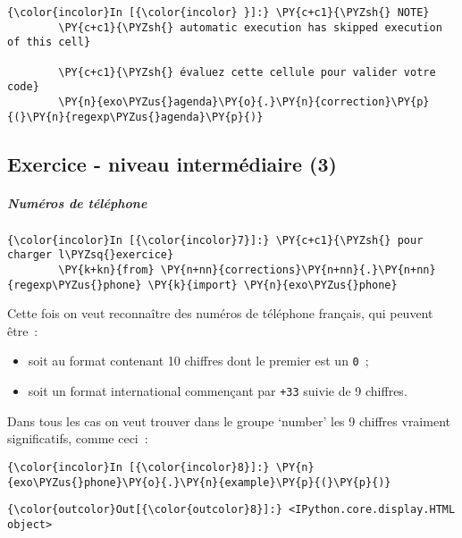    \begin{Verbatim}[commandchars=\\\{\}]
{\color{incolor}In [{\color{incolor} }]:} \PY{c+c1}{\PYZsh{} NOTE}
        \PY{c+c1}{\PYZsh{} automatic execution has skipped execution of this cell}
        
        \PY{c+c1}{\PYZsh{} évaluez cette cellule pour valider votre code}
        \PY{n}{exo\PYZus{}agenda}\PY{o}{.}\PY{n}{correction}\PY{p}{(}\PY{n}{regexp\PYZus{}agenda}\PY{p}{)}
\end{Verbatim}


    \hypertarget{exercice---niveau-intermuxe9diaire-3}{%
\subsection{Exercice - niveau intermédiaire
(3)}\label{exercice---niveau-intermuxe9diaire-3}}

    \hypertarget{numuxe9ros-de-tuxe9luxe9phone}{%
\subparagraph{Numéros de
téléphone}\label{numuxe9ros-de-tuxe9luxe9phone}}

    \begin{Verbatim}[commandchars=\\\{\}]
{\color{incolor}In [{\color{incolor}7}]:} \PY{c+c1}{\PYZsh{} pour charger l\PYZsq{}exercice}
        \PY{k+kn}{from} \PY{n+nn}{corrections}\PY{n+nn}{.}\PY{n+nn}{regexp\PYZus{}phone} \PY{k}{import} \PY{n}{exo\PYZus{}phone}
\end{Verbatim}


    Cette fois on veut reconnaître des numéros de téléphone français, qui
peuvent être~:

\begin{itemize}
\tightlist
\item
  soit au format contenant 10 chiffres dont le premier est un
  \texttt{0}~;
\item
  soit un format international commençant par \texttt{+33} suivie de 9
  chiffres.
\end{itemize}

Dans tous les cas on veut trouver dans le groupe `number' les 9 chiffres
vraiment significatifs, comme ceci~:

    \begin{Verbatim}[commandchars=\\\{\}]
{\color{incolor}In [{\color{incolor}8}]:} \PY{n}{exo\PYZus{}phone}\PY{o}{.}\PY{n}{example}\PY{p}{(}\PY{p}{)}
\end{Verbatim}


\begin{Verbatim}[commandchars=\\\{\}]
{\color{outcolor}Out[{\color{outcolor}8}]:} <IPython.core.display.HTML object>
\end{Verbatim}
            
